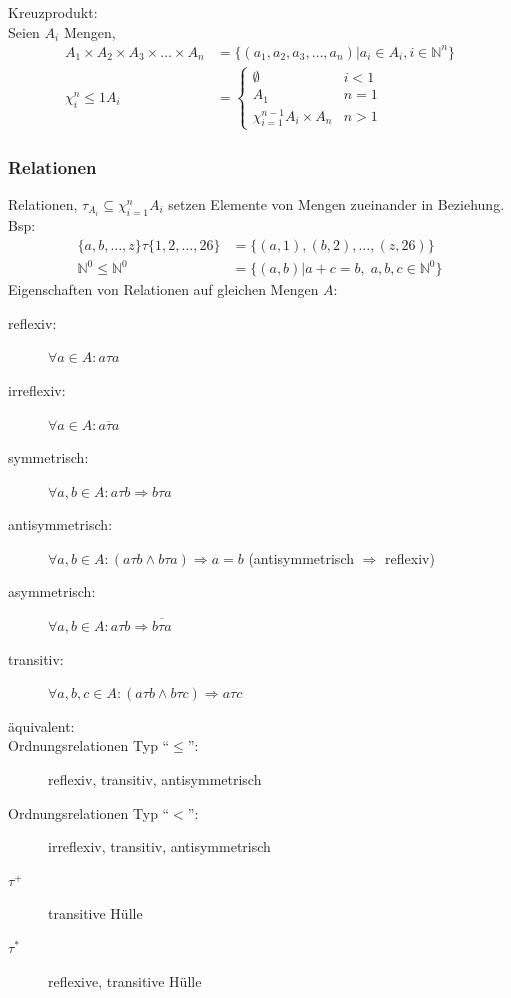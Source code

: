 \documentclass{scrartcl}
\begin{document}
Kreuzprodukt: \\
Seien $A_i$ Mengen,
\begin{align*}
A_1 \times A_2 \times A_3 \times \dots \times A_n &= \{ \left(a_1,a_2,a_3,\dots,a_n\right) | a_i\in A_i, i\in \mathds{N}^n\} \\
\chi^n_i\leq1 A_i &=
\begin{cases}
\emptyset & i<1 \\
A_1 & n=1 \\
\chi^{n-1}_{i=1} A_i \times A_n & n>1
\end{cases}
\end{align*}

\subsubsection*{Relationen}
Relationen, $\tau_{A_i} \subseteq \chi^n_{i=1} A_i$ setzen Elemente von Mengen zueinander in Beziehung. \\
Bsp:
\begin{align*}
    \{a,b,\dots,z\} \tau \{1,2,\dots,26\} &= \{(a,1),(b,2),\dots,(z,26)\} \\
    \mathds{N}^0 \leq \mathds{N}^0 &= \{(a,b) | a+c=b,\; a,b,c\in \mathds{N}^0\}
\end{align*}
Eigenschaften von Relationen auf gleichen Mengen $A$:
\begin{description}
    \item[reflexiv:] $\forall a\in A: a\tau a$
    \item[irreflexiv:]$\forall a\in A: \overline{a\tau a}$
    \item[symmetrisch:]$\forall a,b\in A: a\tau b \Rightarrow b\tau a$
    \item[antisymmetrisch:] $\forall a,b\in A: \left(a\tau b\wedge b\tau a\right) \Rightarrow a=b$ {\tiny (antisymmetrisch $\Rightarrow$ reflexiv)}
    \item[asymmetrisch:] $\forall a,b\in A: a\tau b \Rightarrow \overline{b\tau a}$
    \item[transitiv:] $\forall a,b,c\in A: \left(a\tau b\wedge b\tau c\right) \Rightarrow a\tau c$
    \item[äquivalent:]
    \item[Ordnungsrelationen Typ "`$\leq$"':] reflexiv, transitiv, antisymmetrisch
    \item[Ordnungsrelationen Typ "`$<$"':] irreflexiv, transitiv, antisymmetrisch
    \item[$\tau^+$] transitive Hülle
    \item[$\tau^*$] reflexive, transitive Hülle
\end{description}
\end{document}
